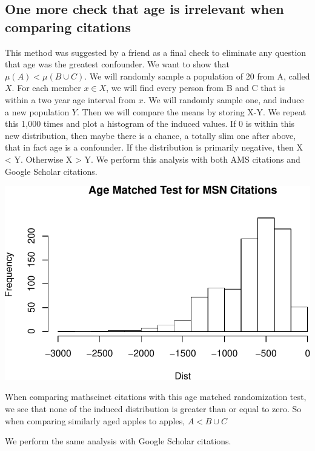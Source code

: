 \documentclass[]{article}
\begin{document}
\hypertarget{one-more-check-that-age-is-irrelevant-when-comparing-citations}{%
\subsection{One more check that age is irrelevant when comparing
citations}\label{one-more-check-that-age-is-irrelevant-when-comparing-citations}}

This method was suggested by a friend as a final check to eliminate any
question that age was the greatest confounder. We want to show that
\(\mu(A) < \mu(B \cup C)\). We will randomly sample a population of 20
from A, called \(X\). For each member \(x \in X\), we will find every
person from B and C that is within a two year age interval from \(x\).
We will randomly sample one, and induce a new population \(Y\). Then we
will compare the means by storing X-Y. We repeat this 1,000 times and
plot a histogram of the induced values. If 0 is within this new
distribution, then maybe there is a chance, a totally slim one after
above, that in fact age is a confounder. If the distribution is
primarily negative, then X \textless{} Y. Otherwise X \textgreater{} Y.
We perform this analysis with both AMS citations and Google Scholar
citations.

\includegraphics{index_files/figure-latex/unnamed-chunk-36-1.pdf}

When comparing mathscinet citations with this age matched randomization
test, we see that none of the induced distribution is greater than or
equal to zero. So when comparing similarly aged apples to apples,
\(A < B\cup C\)

We perform the same analysis with Google Scholar citations.
\end{document}
